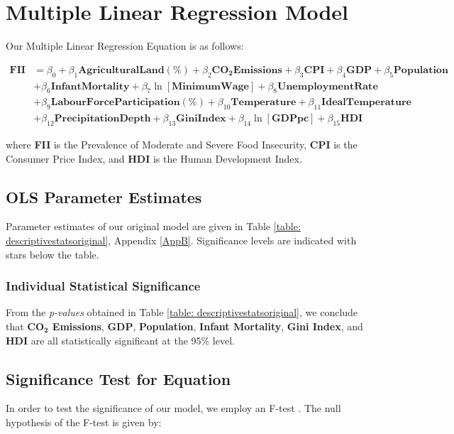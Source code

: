 \documentclass{article}
\begin{document}
\section{Multiple Linear Regression Model}

Our Multiple Linear Regression Equation is as follows: 

\begin{equation}
    \begin{aligned}
        \mathbf{FII} &= \beta_0 + \beta_1\mathbf{AgriculturalLand(\%)} + \beta_2\mathbf{CO_2Emissions} + \beta_3\mathbf{CPI} + \beta_4\mathbf{GDP} + \beta_5\mathbf{Population} \\ & + \beta_6\mathbf{InfantMortality} + \beta_7\ln{[\mathbf{MinimumWage}]} + \beta_8\mathbf{UnemploymentRate} \\ & + \beta_9\mathbf{LabourForceParticipation(\%)} + \beta_{10}\mathbf{Temperature} + \beta_{11}\mathbf{IdealTemperature} \\ & + \beta_{12}\mathbf{PrecipitationDepth} + \beta_{13}\mathbf{GiniIndex} + \beta_{14}\ln{[\mathbf{GDPpc}]} + \beta_{15}\mathbf{HDI}
    \end{aligned}
\end{equation}

\noindent where \textbf{FII} is the Prevalence of Moderate and Severe Food Insecurity, \textbf{CPI} is the Consumer Price Index, and \textbf{HDI} is the Human Development Index.

\subsection{OLS Parameter Estimates}
Parameter estimates of our original model are given in Table \ref{table: descriptivestatsoriginal}, Appendix \ref{AppB}. Significance levels are indicated with stars below the table. 

\subsubsection{Individual Statistical Significance}\label{IndividualSignificance}
From the \textit{p-values} obtained in Table \ref{table: descriptivestatsoriginal}, we conclude that \textbf{$\bm{\text{CO}_2}$ Emissions}, \textbf{GDP}, \textbf{Population}, \textbf{Infant Mortality}, \textbf{Gini Index}, and \textbf{HDI} are all statistically significant at the 95\% level. 

\subsection{Significance Test for Equation}\label{sec:sigtest}
In order to test the significance of our model, we employ an F-test \cite{Greene2003Econometric}. The null hypothesis of the F-test is given by:
\end{document}

